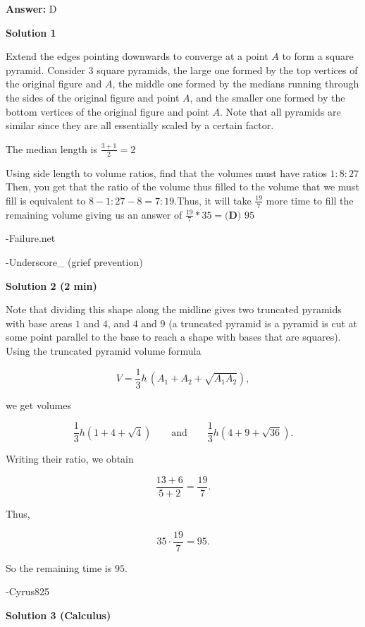\begin{enumerate}
 \textbf{Answer: }D



\textbf{Solution 1}

Extend the edges pointing downwards to converge at a point $A$ to form a square pyramid. Consider 3 square pyramids, the large one formed by the top vertices of the original figure and $A$, the middle one formed by the medians running through the sides of the original figure and point $A$, and the smaller one formed by the bottom vertices of the original figure and point $A$. Note that all pyramids are similar since they are all essentially scaled by a certain factor.

 The median length is $\frac{3+1}{2}=2$

 Using side length to volume ratios, find that the volumes must have ratios $1:8:27$Then, you get that the ratio of the volume thus filled to the volume that we must fill is equivalent to $8-1:27-8 =  7:19$.Thus, it will take $\frac{19}{7}$ more time to fill the remaining volume giving us an answer of $\frac{19}{7} * 35 = \boxed{\textbf{(D) }95}$

 -Failure.net

 -Underscore\_ (grief prevention)

 



\textbf{Solution 2 (2 min)}

Note that dividing this shape along the midline gives two truncated pyramids with base areas \(1\) and \(4\), and \(4\) and \(9\) (a truncated pyramid is a pyramid is cut at some point parallel to the base to reach a shape with bases that are squares). Using the truncated pyramid volume formula

 
 \[V = \frac{1}{3}h\,(A_1 + A_2 + \sqrt{A_1A_2}),\]

 we get volumes

 
 \[\frac{1}{3}h(1 + 4 + \sqrt{4}) \qquad\text{and}\qquad \frac{1}{3}h(4 + 9 + \sqrt{36}).\]

 Writing their ratio, we obtain

 
 \[\frac{13 + 6}{5 + 2} = \frac{19}{7}.\]

 Thus,

 
 \[35 \cdot \frac{19}{7} = 95.\]

 So the remaining time is \(\boxed{95}\).

 -Cyrus825

 



\textbf{Solution 3 (Calculus)}


\end{enumerate}
